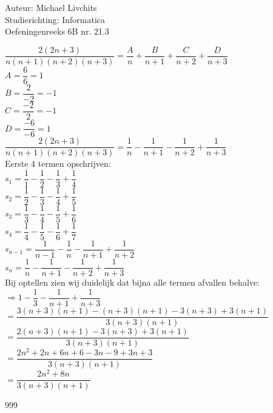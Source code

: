 \documentclass[a4paper]{article}
\begin{document}
  
\noindent \large Auteur: Michael Livchits \\
\noindent \large Studierichting: Informatica\\
\noindent \large Oefeningenreeks 6B nr. 21.3\\

\medskip

\normalsize

$\dfrac{2(2n+3)}{n(n+1)(n+2)(n+3)} = \dfrac{A}{n} +\dfrac{B}{n+1}+\dfrac{C}{n+2}+\dfrac{D}{n+3}$\\

$A = \dfrac{6}{6} = 1$\\

$B = \dfrac{2}{-2} = -1$\\

$C = \dfrac{-2}{2} = -1$\\

$D = \dfrac{-6}{-6} = 1$\\

$\dfrac{2(2n+3)}{n(n+1)(n+2)(n+3)} = \dfrac{1}{n} -\dfrac{1}{n+1}-\dfrac{1}{n+2}+\dfrac{1}{n+3}$\\

Eerste 4 termen opschrijven:\\

$s_1 = \dfrac{1}{1}-\dfrac{1}{2}-\dfrac{1}{3}+\dfrac{1}{4}$\\

$s_2 = \dfrac{1}{2}-\dfrac{1}{3}-\dfrac{1}{4}+\dfrac{1}{5}$\\

$s_3 = \dfrac{1}{3}-\dfrac{1}{4}-\dfrac{1}{5}+\dfrac{1}{6}$\\

$s_4 = \dfrac{1}{4}-\dfrac{1}{5}-\dfrac{1}{6}+\dfrac{1}{7}$\\

$s_{n-1} = \dfrac{1}{n-1}-\dfrac{1}{n}-\dfrac{1}{n+1}+\dfrac{1}{n+2}$\\

$s_n = \dfrac{1}{n}-\dfrac{1}{n+1}-\dfrac{1}{n+2}+\dfrac{1}{n+3}$\\

Bij optellen zien wij duidelijk dat bijna alle termen afvallen behalve:\\

$\Rightarrow 1-\dfrac{1}{3}-\dfrac{1}{n+1}+\dfrac{1}{n+3}$\\

$= \dfrac{3(n+3)(n+1)-(n+3)(n+1)-3(n+3)+3(n+1)}{3(n+3)(n+1)}$\\

$= \dfrac{2(n+3)(n+1)-3(n+3)+3(n+1)}{3(n+3)(n+1)}$\\

$= \dfrac{2n^2+2n+6n+6-3n-9+3n+3}{3(n+3)(n+1)}$\\

$= \dfrac{2n^2+8n}{3(n+3)(n+1)}$\\

\begin{thebibliography}{999}
\end{thebibliography}
\end{document}
